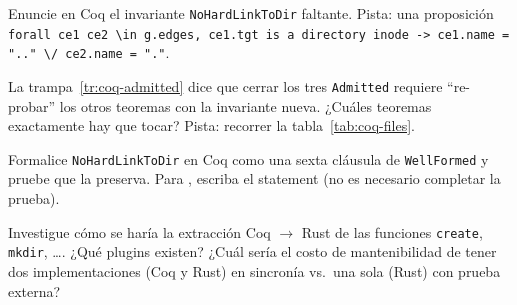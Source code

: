 \begin{ejercicio}[\dificultad{$\star\star$}]
\label{ej:coq-5}
Enuncie en Coq el invariante \texttt{NoHardLinkToDir} faltante. Pista:
una proposición \texttt{forall ce1 ce2 \textbackslash in g.edges,
ce1.tgt is a directory inode -> ce1.name = ".." \textbackslash/
ce2.name = "."}.
\end{ejercicio}

\begin{ejercicio}[\dificultad{$\star\star$}]
\label{ej:coq-6}
La trampa~\ref{tr:coq-admitted} dice que cerrar los tres
\texttt{Admitted} requiere ``re-probar'' los otros teoremas con la
invariante nueva. ¿Cuáles teoremas exactamente hay que tocar? Pista:
recorrer la tabla~\ref{tab:coq-files}.
\end{ejercicio}

\begin{ejercicio}[\dificultad{$\star\star\star$}]
\label{ej:coq-extension}
Formalice \texttt{NoHardLinkToDir} en Coq como una sexta cláusula de
\texttt{WellFormed} y pruebe que \opcreate{} la preserva. Para
\opmkdir, escriba el statement (no es necesario completar la prueba).
\end{ejercicio}

\begin{ejercicio}[\dificultad{$\star\star\star$}]
\label{ej:coq-extract}
Investigue cómo se haría la extracción Coq $\to$ Rust de las funciones
\texttt{create}, \texttt{mkdir}, \dots. ¿Qué plugins existen? ¿Cuál
sería el costo de mantenibilidad de tener dos implementaciones (Coq y
Rust) en sincronía vs.\ una sola (Rust) con prueba externa?
\end{ejercicio}
